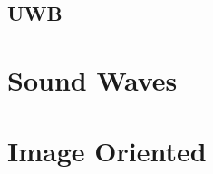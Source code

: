 \subsection{UWB}



\section{Sound Waves}

\cite{sound-waves-for-drone-localization}

\section{Image Oriented}






